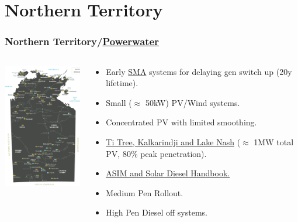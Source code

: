 \documentclass{beamer}
\begin{document}
\section{Northern Territory}
\begin{frame}\frametitle{Northern Territory/\href{http://www.powerwater.com.au}{Powerwater}}
\begin{columns}
\begin{column}{5cm}
\includegraphics[width=5cm]{PW_map_section_A4.jpg}
\end{column}
\begin{column}{6cm}
  \begin{itemize}
  \item Early \href{http://www.sma.de/en.html}{SMA} systems for delaying gen switch up (20y lifetime).
  \item Small ($\approx$ 50kW) PV/Wind systems.
  \item Concentrated PV with limited smoothing.
  \item \href{http://www.epuron.com.au/project/tkln}{Ti Tree, Kalkarindji and Lake Nash} ($\approx$ 1MW total PV, 80\%
    peak penetration).
  \item \href{http://www.powerwater.com.au/solardiesel}{ASIM and Solar Diesel Handbook.}
  \item Medium Pen Rollout.
  \item High Pen Diesel off systems.
  \end{itemize}
\end{column}
\end{columns}
\end{frame}
\end{document}
